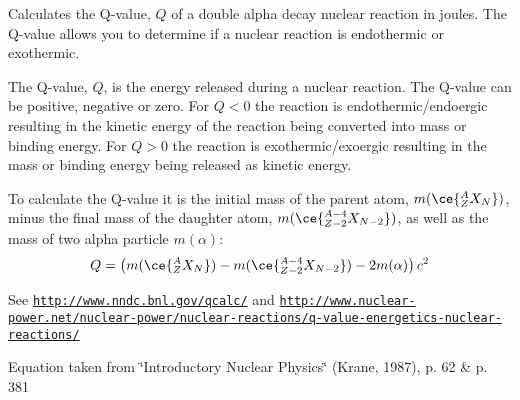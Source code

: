 Calculates the Q-\/value, $Q$ of a double alpha decay nuclear reaction in joules. The Q-\/value allows you to determine if a nuclear reaction is endothermic or exothermic. 

The Q-\/value, $Q$, is the energy released during a nuclear reaction. The Q-\/value can be positive, negative or zero. For $Q < 0$ the reaction is endothermic/endoergic resulting in the kinetic energy of the reaction being converted into mass or binding energy. For $Q > 0$ the reaction is exothermic/exoergic resulting in the mass or binding energy being released as kinetic energy.

To calculate the Q-\/value it is the initial mass of the parent atom, $m(\ce{ ^{A}_{Z}X_{N} })$, minus the final mass of the daughter atom, $m(\ce{ ^{A-4}_{Z-2}X_{N-2} })$, as well as the mass of two alpha particle $m(\alpha)$\+: \[Q = \left ( m(\ce{ ^{A}_{Z}X_{N} })-m(\ce{ ^{A-4}_{Z-2}X_{N-2} })-2m(\alpha) \right) c^2\]

See \href{http://www.nndc.bnl.gov/qcalc/}{\tt http\+://www.\+nndc.\+bnl.\+gov/qcalc/} and \href{http://www.nuclear-power.net/nuclear-power/nuclear-reactions/q-value-energetics-nuclear-reactions/}{\tt http\+://www.\+nuclear-\/power.\+net/nuclear-\/power/nuclear-\/reactions/q-\/value-\/energetics-\/nuclear-\/reactions/}

Equation taken from \char`\"{}\+Introductory Nuclear Physics\char`\"{} (Krane, 1987), p. 62 \& p. 381


